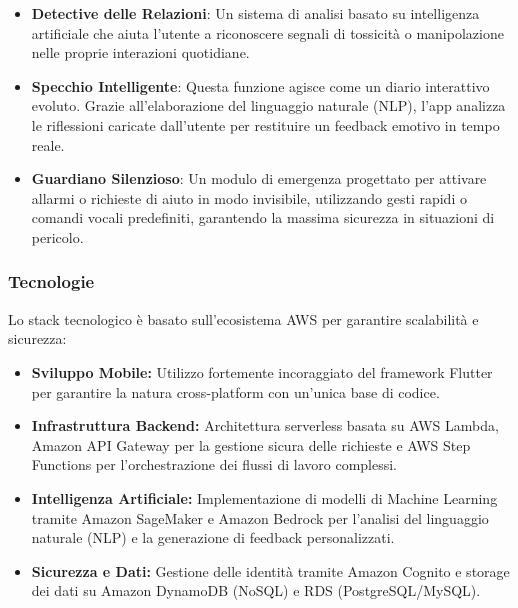 \documentclass[a4paper, 10pt, colorlinks=true, linkcolor=black, urlcolor=blue, citecolor=blue, hidelinks]{article}
\begin{document}
\begin{itemize}
\begin{itemize}
    \item \textbf{Detective delle Relazioni}: Un sistema di analisi basato su intelligenza artificiale che aiuta l'utente a riconoscere segnali di tossicità o manipolazione nelle proprie interazioni quotidiane.
    \item \textbf{Specchio Intelligente}: Questa funzione agisce come un diario interattivo evoluto. Grazie all'elaborazione del linguaggio naturale (NLP), l'app analizza le riflessioni caricate dall'utente per restituire un feedback emotivo in tempo reale.
    \item \textbf{Guardiano Silenzioso}: Un modulo di emergenza progettato per attivare allarmi o richieste di aiuto in modo invisibile, utilizzando gesti rapidi o comandi vocali predefiniti, garantendo la massima sicurezza in situazioni di pericolo.
\end{itemize}

\subsubsection{Tecnologie}
Lo stack tecnologico è basato sull'ecosistema AWS per garantire scalabilità e sicurezza:
\begin{itemize}
    \item \textbf{Sviluppo Mobile:} Utilizzo fortemente incoraggiato del framework Flutter per garantire la natura cross-platform con un'unica base di codice.
    \item \textbf{Infrastruttura Backend:} Architettura serverless basata su AWS Lambda, Amazon API Gateway per la gestione sicura delle richieste e AWS Step Functions per l'orchestrazione dei flussi di lavoro complessi.
    \item \textbf{Intelligenza Artificiale:} Implementazione di modelli di Machine Learning tramite Amazon SageMaker e Amazon Bedrock per l'analisi del linguaggio naturale (NLP) e la generazione di feedback personalizzati.
    \item \textbf{Sicurezza e Dati:} Gestione delle identità tramite Amazon Cognito e storage dei dati su Amazon DynamoDB (NoSQL) e RDS (PostgreSQL/MySQL).
\end{itemize}


\end{itemize}
\end{document}
